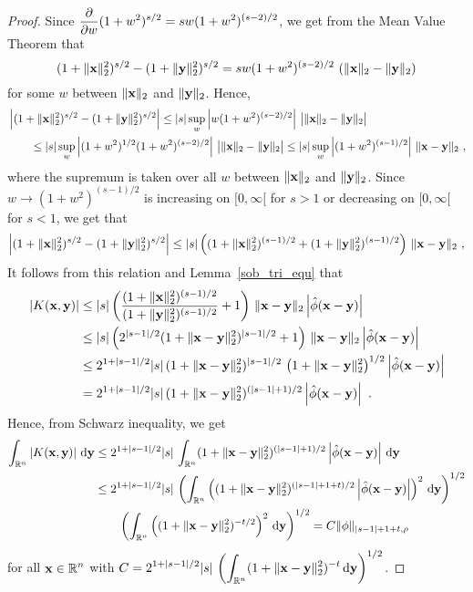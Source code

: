 \begin{proof}
Since
$\displaystyle \pdfdx{(1+w^2)^{s/2}}{w} = sw(1+w^2)^{(s-2)/2}$, we get
from the Mean Value Theorem that
\[
(1+\|\VEC{x}\|_2^2)^{s/2} - (1+\|\VEC{y}\|_2^2)^{s/2}
= sw(1+w^2)^{(s-2)/2} \, \left( \|\VEC{x}\|_2 - \|\VEC{y}\|_2 \right)
\]
for some $w$ between $\|\VEC{x}\|_2$ and $\|\VEC{y}\|_2$.  Hence,
\begin{align*}
&\left| (1+\|\VEC{x}\|_2^2)^{s/2} - (1+\|\VEC{y}\|_2^2)^{s/2} \right|
\leq |s| \sup_{w} \left| w(1+w^2)^{(s-2)/2}\right|
\, \big| \|\VEC{x}\|_2 - \|\VEC{y}\|_2 \big| \\
&\qquad \leq |s| \sup_{w} \left| (1 + w^2)^{1/2} (1+w^2)^{(s-2)/2}\right|
\, \big| \|\VEC{x}\|_2 - \|\VEC{y}\|_2 \big|
\leq |s| \sup_{w} \left|(1+w^2)^{(s-1)/2}\right|
\, \|\VEC{x} - \VEC{y}\|_2 \ ,
\end{align*}
where the supremum is taken over all $w$ between $\|\VEC{x}\|_2$ and
$\|\VEC{y}\|_2$.  Since $w \to (1+w^2)^{(s-1)/2}$ is increasing on
$[0,\infty[$ for $s > 1$ or decreasing on $[0,\infty[$ for $s<1$, we
get that
\[
\left| (1+\|\VEC{x}\|_2^2)^{s/2} - (1+\|\VEC{y}\|_2^2)^{s/2} \right|
\leq |s| \left( (1+\|\VEC{x}\|_2^2)^{(s-1)/2} + (1+\|\VEC{y}\|_2^2)^{(s-1)/2}
\right) \, \|\VEC{x} - \VEC{y}\|_2 \ ,
\]
It follows from this relation and Lemma~\ref{sob_tri_equ} that
\begin{align*}
\left| K(\VEC{x},\VEC{y}) \right|
&\leq |s| \left(
\frac{(1+\|\VEC{x}\|_2^2)^{(s-1)/2}}{(1+\|\VEC{y}\|_2^2)^{(s-1)/2}} + 1 \right)
\, \|\VEC{x} - \VEC{y}\|_2
\left|\hat{\phi}(\VEC{x}-\VEC{y})\right| \\
&\leq  |s| \left( 2^{|s-1|/2} (1+\|\VEC{x}-\VEC{y}\|_2^2)^{|s-1|/2} + 1 \right)
\, \|\VEC{x} - \VEC{y}\|_2
\left|\hat{\phi}(\VEC{x}-\VEC{y})\right| \\
&\leq 2^{1+|s-1|/2} |s|\, (1+\|\VEC{x}-\VEC{y}\|_2^2)^{|s-1|/2}
\, \left( 1 + \|\VEC{x} - \VEC{y}\|_2^2\right)^{1/2}
\left|\hat{\phi}(\VEC{x}-\VEC{y})\right| \\
&= 2^{1+|s-1|/2} |s|\, (1+\|\VEC{x}-\VEC{y}\|_2^2)^{(|s-1|+1)/2}
\left|\hat{\phi}(\VEC{x}-\VEC{y})\right| \ .
\end{align*}
Hence, from Schwarz inequality, we get
\begin{align*}
\int_{\RR^n} \left|K(\VEC{x},\VEC{y})\right| \dx{\VEC{y}}
&\leq 2^{1+|s-1|/2} |s|\, \int_{\RR^n} (1+\|\VEC{x}-\VEC{y}\|_2^2)^{(|s-1|+1)/2}
\left|\hat{\phi}(\VEC{x}-\VEC{y})\right| \dx{\VEC{y}} \\
&\leq  2^{1+|s-1|/2} |s|\, \left(\int_{\RR^n}
\left((1+\|\VEC{x}-\VEC{y}\|_2^2)^{(|s-1|+1+t)/2}
\left|\hat{\phi}(\VEC{x}-\VEC{y})\right|\right)^2 \dx{\VEC{y}} \right)^{1/2} \\
&\qquad \left( \int_{\RR^n} \left( (1+\|\VEC{x}-\VEC{y}\|_2^2)^{-t/2} \right)^2 
\dx{\VEC{y}} \right)^{1/2}
= C \|\phi\|_{|s-1|+1+t,\rho}
\end{align*}
for all $\displaystyle \VEC{x} \in \RR^n$ with
$\displaystyle C = 2^{1+|s-1|/2} |s|\, 
\left( \int_{\RR^n} (1+\|\VEC{x}-\VEC{y}\|_2^2)^{-t}\dx{\VEC{y}} \right)^{1/2}$.


\end{proof}

